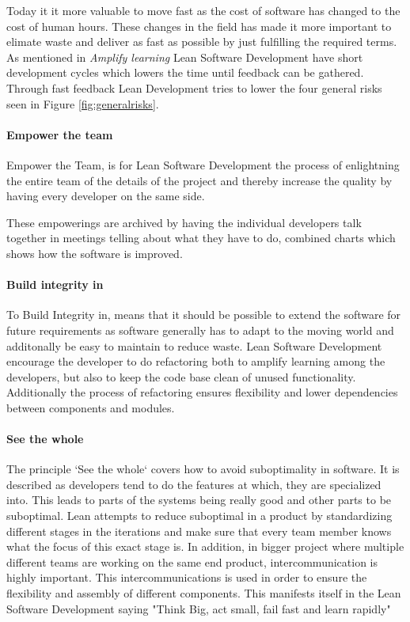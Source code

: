 \documentclass{sig-alternate}
\begin{document}
Today it it more valuable to move fast as the cost of software has changed to the cost of human hours. 
These changes in the field has made it more important to elimate waste and deliver as fast as possible 
by just fulfilling the required terms.
As mentioned in \textit{Amplify learning} Lean Software Development have short development cycles which 
lowers the time until feedback can be gathered. Through fast feedback Lean Development tries to lower 
the four general risks seen in Figure \ref{fig:generalrisks}.

\paragraph{Empower the team}
Empower the Team, is for Lean Software Development the process of enlightning the entire team of the 
details of the project and thereby increase the quality by having every developer on the same side. 

These empowerings are archived by having the individual developers talk together in meetings telling
about what they have to do, combined charts which shows how the software is improved.

\paragraph{Build integrity in}
To Build Integrity in, means that it should be possible to extend the software for future requirements 
as software generally has to adapt to the moving world and additonally be easy to maintain to reduce waste.
Lean Software Development encourage the developer to do refactoring both to amplify learning among the 
developers, but also to keep the code base clean of unused functionality. 
Additionally the process of refactoring ensures flexibility and lower dependencies between components 
and modules.  

\paragraph{See the whole}
The principle `See the whole` covers how to avoid suboptimality in software. 
It is described as developers tend to do the features at which, they are specialized into.
This leads to parts of the systems being really good and other parts to be suboptimal.
Lean attempts to reduce suboptimal in a product by standardizing different stages in the iterations and 
make sure that every team member knows what the focus of this exact stage is. 
In addition, in bigger project where multiple different teams are working on the same end product, 
intercommunication is highly important. 
This intercommunications is used in order to ensure the flexibility and assembly of different components. 
This manifests itself in the Lean Software Development saying "Think Big, act small, fail fast and learn rapidly" \cite{poppendieck:lean} 
\end{document}
